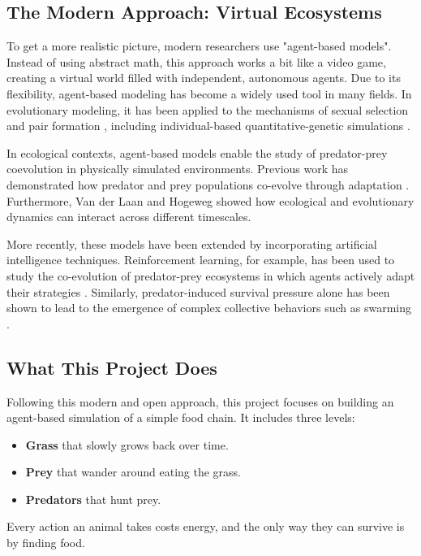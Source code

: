 \documentclass[english]{projectreport}
\begin{document}
\subsection{The Modern Approach: Virtual Ecosystems}
To get a more realistic picture, modern researchers use "agent-based models". Instead of using abstract math, this approach works a bit like a video game, creating a virtual world filled with independent, autonomous agents. Due to its flexibility, agent-based modeling has become a widely used tool in many fields. In evolutionary modeling, it has been applied to the mechanisms of sexual selection and pair formation \cite{drezewski2018}, including individual-based quantitative-genetic simulations \cite{dijk2010}.

In ecological contexts, agent-based models enable the study of predator-prey coevolution in physically simulated environments. Previous work has demonstrated how predator and prey populations co-evolve through adaptation \cite{ouannes2015, takashi2013}. Furthermore, Van der Laan and Hogeweg \cite{vanderlaan1995} showed how ecological and evolutionary dynamics can interact across different timescales.

More recently, these models have been extended by incorporating artificial intelligence techniques. Reinforcement learning, for example, has been used to study the co-evolution of predator-prey ecosystems in which agents actively adapt their strategies \cite{park2021}. Similarly, predator-induced survival pressure alone has been shown to lead to the emergence of complex collective behaviors such as swarming \cite{li2023}.

\subsection{What This Project Does}
Following this modern and open approach, this project focuses on building an agent-based simulation of a simple food chain. It includes three levels:
\begin{itemize}
\item \textbf{Grass} that slowly grows back over time.
\item \textbf{Prey} that wander around eating the grass.
\item \textbf{Predators} that hunt prey.
\end{itemize}

Every action an animal takes costs energy, and the only way they can survive is by finding food.
\end{document}
